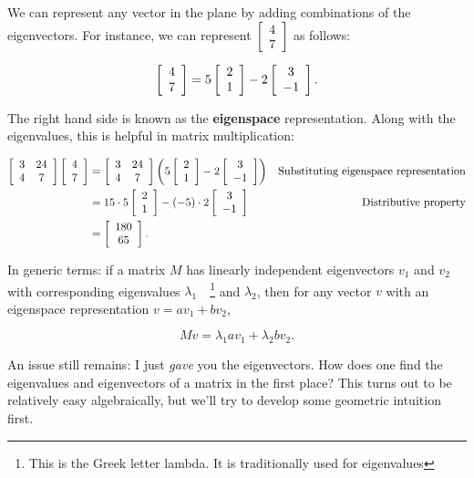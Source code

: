 \documentclass[../gatm.tex]{subfiles}
\begin{document}
We can represent any vector in the plane by adding combinations of the eigenvectors. For instance, we can represent $\left[\begin{smallmatrix} 4 \\ 7 \end{smallmatrix}\right]$ as follows:

$$\left[\begin{array}{c} 4 \\ 7 \end{array}\right] = 5\left[\begin{array}{c} 2 \\ 1 \end{array}\right] - 2\left[\begin{array}{c} 3 \\ -1 \end{array}\right].$$

The right hand side is known as the \textbf{eigenspace} representation. Along with the eigenvalues, this is helpful in matrix multiplication:

\begin{align*}
\left[\begin{array}{cc} 3 & 24 \\ 4 & 7 \end{array}\right]\left[\begin{array}{c} 4 \\ 7 \end{array}\right]&=\left[\begin{array}{cc} 3 & 24 \\ 4 & 7 \end{array}\right]\left(5\left[\begin{array}{c} 2 \\ 1 \end{array}\right]-2\left[\begin{array}{c} 3 \\ -1 \end{array}\right]\right) & \text{Substituting eigenspace representation} \\
&= 15\cdot 5 \left[\begin{array}{c} 2 \\ 1 \end{array}\right] - (-5)\cdot 2 \left[\begin{array}{c} 3 \\ -1 \end{array}\right] & \text{Distributive property} \\
&= \left[\begin{array}{c} 180 \\ 65 \end{array}\right]. \\
\end{align*}

In generic terms: if a matrix $M$ has linearly independent eigenvectors $v_1$ and $v_2$ with corresponding eigenvalues $\lambda_1\quad$\footnote{This is the Greek letter lambda. It is traditionally used for eigenvalues} and $\lambda_2$, then for any vector $v$ with an eigenspace representation $v=av_1+bv_2$,

$$Mv=\lambda_1av_1 + \lambda_2bv_2.$$

An issue still remains: I just \textit{gave} you the eigenvectors. How does one find the eigenvalues and eigenvectors of a matrix in the first place? This turns out to be relatively easy algebraically, but we'll try to develop some geometric intuition first.
\end{document}
